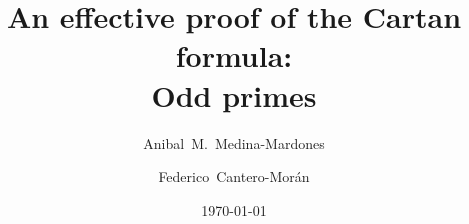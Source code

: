 \documentclass{amsart}
\title[An effective proof of the Cartan formula: Odd primes]{An effective proof of the Cartan formula:\\Odd primes}
\author[Medina-Mardones]{Anibal~M.~Medina-Mardones}
\author[Cantero-Mor\'an]{Federico~Cantero-Mor\'an}
\date{\today}
\begin{document}
	
	\maketitle
	
	
	
	
	
	
	
	
	\sloppy
	\printbibliography
\end{document}

